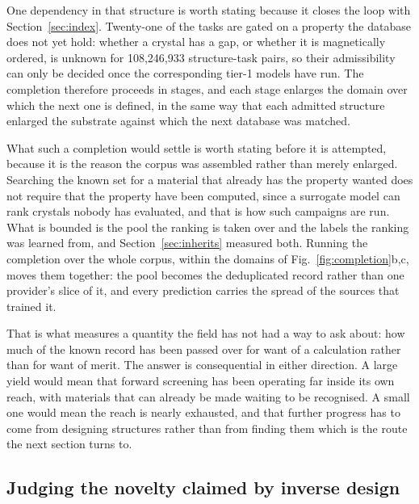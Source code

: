 One dependency in that structure is worth stating because it closes the loop with
Section~\ref{sec:index}. Twenty-one of the tasks are gated on a property the
database does not yet hold: whether a crystal has a gap, or whether it is
magnetically ordered, is unknown for 108{,}246{,}933 structure-task pairs, so
their admissibility can only be decided once the corresponding tier-1 models have
run.
The completion therefore proceeds in stages, and each stage enlarges the domain
over which the next one is defined, in the same way that each admitted structure
enlarged the substrate against which the next database was matched.

What such a completion would settle is worth stating before it is attempted,
because it is the reason the corpus was assembled rather than merely enlarged.
Searching the known set for a material that already has the property wanted does
not require that the property have been computed, since a surrogate model can
rank crystals nobody has evaluated, and that is how such campaigns are run. What
is bounded is the pool the ranking is taken over and the labels the ranking was
learned from, and Section~\ref{sec:inherits} measured both. Running the
completion over the whole corpus, within the domains of
Fig.~\ref{fig:completion}b,c, moves them together: the pool becomes the
deduplicated record rather than one provider's slice of it, and every prediction
carries the spread of the sources that trained it.

That is what measures a quantity the field has not had a way to ask about: how
much of the known record has been passed over for want of a calculation rather
than for want of merit. The answer is consequential in either direction. A large
yield would mean that forward screening has been operating far inside its own
reach, with materials that can already be made waiting to be recognised. A small
one would mean the reach is nearly exhausted, and that further progress has to
come from designing structures rather than from finding them \textemdash{} which
is the route the next section turns to.

\PENDINGGNN

\PENDINGCANDIDATES

\subsection{Judging the novelty claimed by inverse design}
\label{sec:novelty}


